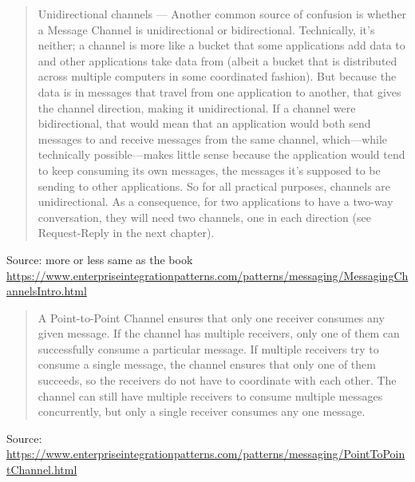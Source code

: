 \documentclass[Screen16to9,17pt]{foils}
\begin{document}


\begin{quote}\small
Unidirectional channels — Another common source of confusion is whether a Message Channel is unidirectional or bidirectional. Technically, it’s neither; a channel is more like a bucket that some applications add data to and other applications take data from (albeit a bucket that is distributed across multiple computers in some coordinated fashion). But because the data is in messages that travel from one application to another, that gives the channel direction, making it unidirectional. If a channel were bidirectional, that would mean that an application would both send messages to and receive messages from the same channel, which—while technically possible—makes little sense because the application would tend to keep consuming its own messages, the messages it’s supposed to be sending to other applications. So for all practical purposes, channels are unidirectional. As a consequence, for two applications to have a two-way conversation, they will need two channels, one in each direction (see Request-Reply in the next chapter).
\end{quote}
Source:  more or less same as the book\\{\footnotesize \url{https://www.enterpriseintegrationpatterns.com/patterns/messaging/MessagingChannelsIntro.html}}




\begin{quote}\footnotesize
A Point-to-Point Channel ensures that only one receiver consumes any given message. If the channel has multiple receivers, only one of them can successfully consume a particular message. If multiple receivers try to consume a single message, the channel ensures that only one of them succeeds, so the receivers do not have to coordinate with each other. The channel can still have multiple receivers to consume multiple messages concurrently, but only a single receiver consumes any one message.
\end{quote}

{\footnotesize Source:\\ \url{https://www.enterpriseintegrationpatterns.com/patterns/messaging/PointToPointChannel.html}}



\end{document}
